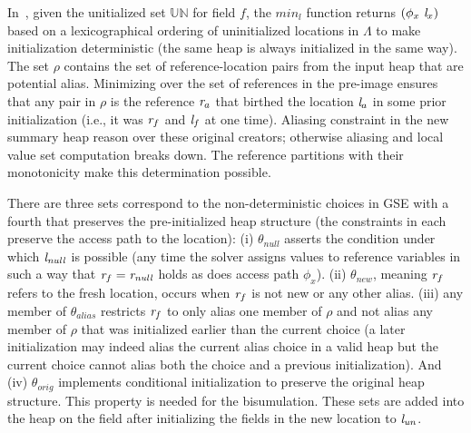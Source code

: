 
In~, given the unitialized set $\mathbb{UN}$ for
field $f$, the $\mathit{min}_l$ function returns
$(\phi_x\ \cfgnt{l}_x)$ based on a lexicographical ordering of
uninitialized locations in $\Lambda$ to make initialization
deterministic (the same heap is always initialized in the same
way). 
The set $\rho$ contains the set of
reference-location pairs from the input heap that are potential
alias. Minimizing over the set of references in the pre-image ensures
that any pair in $\rho$ is the reference $\emph{r}_a$ that birthed
the location $\emph{l}_a$ in some prior initialization (i.e., it was
$\emph{r}_f$ and $\emph{l}_f$ at one time). Aliasing constraint
in the new summary heap reason over these original creators; otherwise aliasing and local value set
computation breaks down.  The reference partitions with their
monotonicity make this determination possible.

There are three sets correspond to the non-deterministic choices in
GSE with a fourth that preserves the pre-initialized heap structure
(the constraints in each preserve the access path to the location):
(i) $\theta_\mathit{null}$ asserts the condition under which
$\emph{l}_\mathit{null}$ is possible (any time the solver assigns
values to reference variables in such a way that $\emph{r}_f =
\emph{r}_\mathit{null}$ holds as does access path $\phi_x$). (ii)
$\theta_\mathit{new}$, meaning $\emph{r}_f$ refers to the fresh
location, occurs when $\emph{r}_f$ is not new or any other alias. (iii) any member of $\theta_\mathit{alias}$ restricts $\emph{r}_f$ to
only alias one member of $\rho$ and not alias any member of $\rho$
that was initialized earlier than the current choice (a later
initialization may indeed alias the current alias choice in a valid
heap but the current choice cannot alias both the choice and a
previous initialization). And (iv) $\theta_\mathit{orig}$  implements conditional initialization to preserve the
original heap structure. This property is needed for the bisumulation. 
These sets are added into the heap on the field after initializing the fields in the new location to $\emph{l}_\mathit{un}$.


